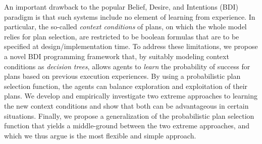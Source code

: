 An important drawback to the popular Belief, Desire, and Intentions (BDI)
paradigm is that such systems include no element of learning from experience.
In particular, the so-called \emph{context conditions} of plans, on which the
whole model relies for plan selection, are restricted to be boolean formulas that
are to be specified at design/implementation time.
To address these limitations, we propose a novel BDI programming framework that,
by suitably modeling context conditions as \emph{decision trees}, allows
agents to \emph{learn} the probability of success for plans based on previous
execution experiences. By using a probabilistic plan selection function, the
agents can balance exploration and exploitation of their plans.
We develop and empirically investigate two extreme approaches to learning the new
context conditions and show that both can be advantageous in certain
situations.
Finally, we propose a generalization of the probabilistic plan selection function
that yields a middle-ground between the two extreme approaches, and which we
thus argue is the most flexible and simple approach.

